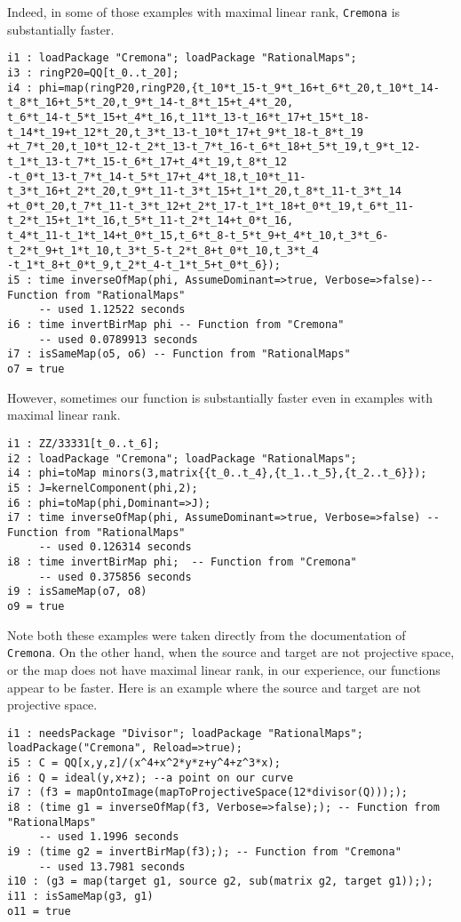 \documentclass[11pt]{amsart}
\numberwithin{equation}{theorem}
\renewcommand{\:}{\colon}
\theoremstyle{theorem}
\begin{document}
{Indeed, in some of those examples with maximal linear rank, {\tt Cremona} is substantially faster.
{\scriptsize
\color{blue}\begin{verbatim}
i1 : loadPackage "Cremona"; loadPackage "RationalMaps";
i3 : ringP20=QQ[t_0..t_20];
i4 : phi=map(ringP20,ringP20,{t_10*t_15-t_9*t_16+t_6*t_20,t_10*t_14-t_8*t_16+t_5*t_20,t_9*t_14-t_8*t_15+t_4*t_20,
t_6*t_14-t_5*t_15+t_4*t_16,t_11*t_13-t_16*t_17+t_15*t_18-t_14*t_19+t_12*t_20,t_3*t_13-t_10*t_17+t_9*t_18-t_8*t_19
+t_7*t_20,t_10*t_12-t_2*t_13-t_7*t_16-t_6*t_18+t_5*t_19,t_9*t_12-t_1*t_13-t_7*t_15-t_6*t_17+t_4*t_19,t_8*t_12
-t_0*t_13-t_7*t_14-t_5*t_17+t_4*t_18,t_10*t_11-t_3*t_16+t_2*t_20,t_9*t_11-t_3*t_15+t_1*t_20,t_8*t_11-t_3*t_14
+t_0*t_20,t_7*t_11-t_3*t_12+t_2*t_17-t_1*t_18+t_0*t_19,t_6*t_11-t_2*t_15+t_1*t_16,t_5*t_11-t_2*t_14+t_0*t_16,
t_4*t_11-t_1*t_14+t_0*t_15,t_6*t_8-t_5*t_9+t_4*t_10,t_3*t_6-t_2*t_9+t_1*t_10,t_3*t_5-t_2*t_8+t_0*t_10,t_3*t_4
-t_1*t_8+t_0*t_9,t_2*t_4-t_1*t_5+t_0*t_6});
i5 : time inverseOfMap(phi, AssumeDominant=>true, Verbose=>false)-- Function from "RationalMaps"
     -- used 1.12522 seconds
i6 : time invertBirMap phi -- Function from "Cremona"
     -- used 0.0789913 seconds
i7 : isSameMap(o5, o6) -- Function from "RationalMaps"
o7 = true
\end{verbatim}
}
{\color{black}\normalsize}
However, sometimes our function is substantially faster even in examples with maximal linear rank.
{\scriptsize
\color{blue}\begin{verbatim}
i1 : ZZ/33331[t_0..t_6];
i2 : loadPackage "Cremona"; loadPackage "RationalMaps";
i4 : phi=toMap minors(3,matrix{{t_0..t_4},{t_1..t_5},{t_2..t_6}});
i5 : J=kernelComponent(phi,2);
i6 : phi=toMap(phi,Dominant=>J);
i7 : time inverseOfMap(phi, AssumeDominant=>true, Verbose=>false) -- Function from "RationalMaps"
     -- used 0.126314 seconds
i8 : time invertBirMap phi;  -- Function from "Cremona"
     -- used 0.375856 seconds
i9 : isSameMap(o7, o8)
o9 = true
\end{verbatim}}

{\color{black}\normalsize
Note both these examples were taken directly from the documentation of {\tt Cremona}.
On the other hand, when the source and target are  not projective space, or the map does not have maximal linear rank, in our experience, our functions appear to be faster.  Here is an example where the source and target are not projective space.
}

{\scriptsize
\color{blue}\begin{verbatim}
i1 : needsPackage "Divisor"; loadPackage "RationalMaps"; loadPackage("Cremona", Reload=>true);
i5 : C = QQ[x,y,z]/(x^4+x^2*y*z+y^4+z^3*x);
i6 : Q = ideal(y,x+z); --a point on our curve
i7 : (f3 = mapOntoImage(mapToProjectiveSpace(12*divisor(Q))););
i8 : (time g1 = inverseOfMap(f3, Verbose=>false);); -- Function from "RationalMaps"
     -- used 1.1996 seconds
i9 : (time g2 = invertBirMap(f3);); -- Function from "Cremona"
     -- used 13.7981 seconds
i10 : (g3 = map(target g1, source g2, sub(matrix g2, target g1)););
i11 : isSameMap(g3, g1)
o11 = true
\end{verbatim}
}

}
\end{document}

